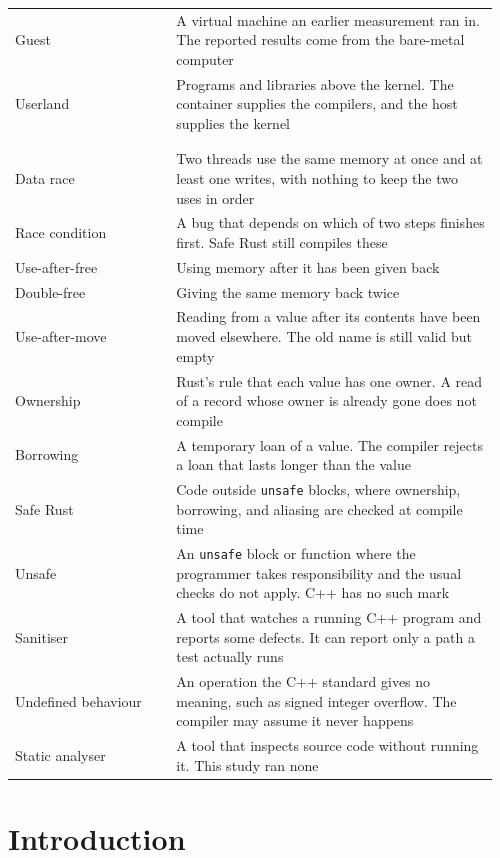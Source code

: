 \documentclass[english,oneside,a4paper,censored,csm,software-track-2020]{HYthesisML}
\begin{document}
\begin{longtable}{@{}>{\scriptsize\raggedright\arraybackslash}p{0.32\linewidth} >{\scriptsize\raggedright\arraybackslash}p{0.64\linewidth}@{}}
Guest & A virtual machine an earlier measurement ran in. The reported results come from the bare-metal computer \\
Userland & Programs and libraries above the kernel. The container supplies the compilers, and the host supplies the kernel \\
\\[2pt]
\multicolumn{2}{@{}l}{\scriptsize\emph{Safety}}\\*[1pt]
Data race & Two threads use the same memory at once and at least one writes, with nothing to keep the two uses in order \\
Race condition & A bug that depends on which of two steps finishes first. Safe Rust still compiles these \\
Use-after-free & Using memory after it has been given back \\
Double-free & Giving the same memory back twice \\
Use-after-move & Reading from a value after its contents have been moved elsewhere. The old name is still valid but empty \\
Ownership & Rust's rule that each value has one owner. A read of a record whose owner is already gone does not compile \\
Borrowing & A temporary loan of a value. The compiler rejects a loan that lasts longer than the value \\
Safe Rust & Code outside \texttt{unsafe} blocks, where ownership, borrowing, and aliasing are checked at compile time \\
Unsafe & An \texttt{unsafe} block or function where the programmer takes responsibility and the usual checks do not apply. C++ has no such mark \\
Sanitiser & A tool that watches a running C++ program and reports some defects. It can report only a path a test actually runs \\
Undefined behaviour & An operation the C++ standard gives no meaning, such as signed integer overflow. The compiler may assume it never happens \\
Static analyser & A tool that inspects source code without running it. This study ran none \\
\hline
\end{longtable}
\endgroup


\cleardoublepage
\mainmatter


\chapter{Introduction}
\end{document}
